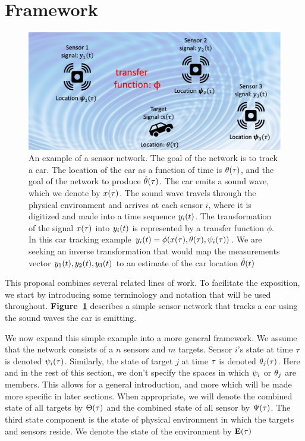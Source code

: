 \section{Framework}

\begin{figure}[b]
\centering
\includegraphics[width=0.9\columnwidth]{figs/Framework.jpg}
\caption{An example of a sensor network\label{fig:prototypicalSensorNetwork}. The goal of the network is to track a car. The location of the car as a function of time is $\theta(\tau)$, and the goal of the network to produce $\hat{\theta}(\tau)$. The car emits a sound wave, which we denote by $x(\tau)$. The sound wave travels through the physical environment and arrives at each sensor $i$, where it is digitized and made into a time sequence $y_i(t)$. The transformation of the signal $x(\tau)$ into $y_i(t)$ is represented by a transfer function $\phi$. In this car tracking example 
$y_i(t) = \phi(x(\tau),\theta(\tau),\psi_i(\tau))$. We are seeking an inverse transformation that would map the measurements vector $y_1(t),y_2(t),y_3(t)$ to an estimate of the car location $\hat{\theta}(t)$}
\end{figure}

This proposal combines several related lines of work. To facilitate the exposition, we start by introducing some terminology and notation that will be used throughout. {\bf Figure~\ref{fig:prototypicalSensorNetwork}} describes a simple sensor network that tracks a car using the sound waves the car is emitting.

We now expand this simple example into a more general framework.
We assume that the network consists of a $n$ sensors and $m$ 
targets. Sensor $i$'s state at time $\tau$ is denoted $\psi_i(\tau)$.  Similarly, the state of target $j$ at time $\tau$ is denoted $\theta_j(\tau)$.
Here and in the rest of this section, we don't specify the spaces in which  $\psi_i$ or $\theta_j$ are members. This allows for a general introduction, and more which will be made more specific in later sections. When appropriate, we will denote the combined state of all targets by $\Theta(\tau)$ and the combined state of all sensor by $\Psi(\tau)$. The third state component is the state of physical environment in which the targets and sensors reside. We denote the state of the environment by $\mathbf{E}(\tau)$

